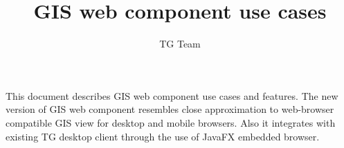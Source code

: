 \begin{titlepage}
\title{GIS web component use cases}
\author{TG Team}
\maketitle
\clearpage
\tableofcontents
\clearpage

This document describes GIS web component use cases and features. The new version of GIS web component resembles close 
approximation to web-browser compatible GIS view for desktop and mobile browsers. Also it integrates with existing
TG desktop client through the use of JavaFX embedded browser.

\end{titlepage}